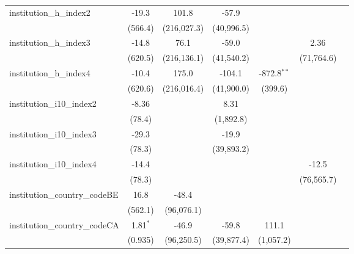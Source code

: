 \begin{tabular}{lcccccc}
   institution\_h\_index2                & -19.3       & 101.8       & -57.9       &               &             &   \\   
                                         & (566.4)     & (216,027.3) & (40,996.5)  &               &             &   \\   
   institution\_h\_index3                & -14.8       & 76.1        & -59.0       &               & 2.36        &   \\   
                                         & (620.5)     & (216,136.1) & (41,540.2)  &               & (71,764.6)  &   \\   
   institution\_h\_index4                & -10.4       & 175.0       & -104.1      & -872.8$^{**}$ &             &   \\   
                                         & (620.6)     & (216,016.4) & (41,900.0)  & (399.6)       &             &   \\   
   institution\_i10\_index2              & -8.36       &             & 8.31        &               &             &   \\   
                                         & (78.4)      &             & (1,892.8)   &               &             &   \\   
   institution\_i10\_index3              & -29.3       &             & -19.9       &               &             &   \\   
                                         & (78.3)      &             & (39,893.2)  &               &             &   \\   
   institution\_i10\_index4              & -14.4       &             &             &               & -12.5       &   \\   
                                         & (78.3)      &             &             &               & (76,565.7)  &   \\   
   institution\_country\_codeBE          & 16.8        & -48.4       &             &               &             &   \\   
                                         & (562.1)     & (96,076.1)  &             &               &             &   \\   
   institution\_country\_codeCA          & 1.81$^{*}$  & -46.9       & -59.8       & 111.1         &             &   \\   
                                         & (0.935)     & (96,250.5)  & (39,877.4)  & (1,057.2)     &             &   \\   

\end{tabular}
